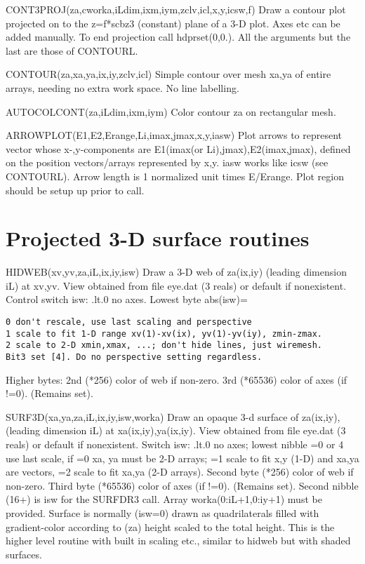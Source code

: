 \documentclass[12pt]{article}
\newif \iftth
\begin{document}
CONT3PROJ(za,cworka,iLdim,ixm,iym,zclv,icl,x,y,icsw,f) Draw a contour
plot projected on to the z=f*scbz3 (constant) plane of a 3-D
plot. Axes etc can be added manually. To end projection call
hdprset(0,0.). All the arguments but the last are those of CONTOURL.

CONTOUR(za,xa,ya,ix,iy,zclv,icl) Simple contour over mesh xa,ya of entire
arrays, needing no extra work space. No line labelling.

AUTOCOLCONT(za,iLdim,ixm,iym) Color contour za on rectangular mesh.

ARROWPLOT(E1,E2,Erange,Li,imax,jmax,x,y,iasw) Plot arrows to represent
vector whose x-,y-components are E1(imax(or Li),jmax),E2(imax,jmax),
defined on the position vectors/arrays represented by x,y. iasw works
like icsw (see CONTOURL). Arrow length is 1 normalized unit times
E/Erange. Plot region should be setup up prior to
call.

\section{Projected 3-D surface routines}

\iftth \special{html:<a href="hidtest.f"><img align="right" src="hidtest.png"></a>}\fi

HIDWEB(xv,yv,za,iL,ix,iy,isw) Draw a 3-D web of za(ix,iy) (leading
dimension iL) at xv,yv.  View obtained from file eye.dat (3 reals) or
default if nonexistent. Control switch isw: .lt.0 no axes.
Lowest byte abs(isw)=
\begin{verbatim}
0 don't rescale, use last scaling and perspective
1 scale to fit 1-D range xv(1)-xv(ix), yv(1)-yv(iy), zmin-zmax.
2 scale to 2-D xmin,xmax, ...; don't hide lines, just wiremesh.
Bit3 set [4]. Do no perspective setting regardless.
\end{verbatim}

Higher bytes: {2nd} (*256) color of web if non-zero. {3rd} (*65536) color
of axes (if !=0). (Remains set).

SURF3D(xa,ya,za,iL,ix,iy,isw,worka) Draw an opaque 3-d surface of
za(ix,iy), (leading dimension iL) at xa(ix,iy),ya(ix,iy).  View
obtained from file eye.dat (3 reals) or default if nonexistent. Switch
isw: .lt.0 no axes; lowest nibble =0 or 4 use last scale, if =0 xa, ya
must be 2-D arrays; =1 scale to fit x,y (1-D) and xa,ya are vectors,
=2 scale to fit xa,ya (2-D arrays). Second byte (*256) color of web if
non-zero. Third byte (*65536) color of axes (if !=0). (Remains
set). Second nibble (16+) is isw for the SURFDR3 call. Array
worka(0:iL+1,0:iy+1) must be provided.  Surface is normally (isw=0)
drawn as quadrilaterals filled with gradient-color according to (za)
height scaled to the total height. This is the higher level routine
with built in scaling etc., similar to hidweb but with shaded surfaces.
\end{document}
